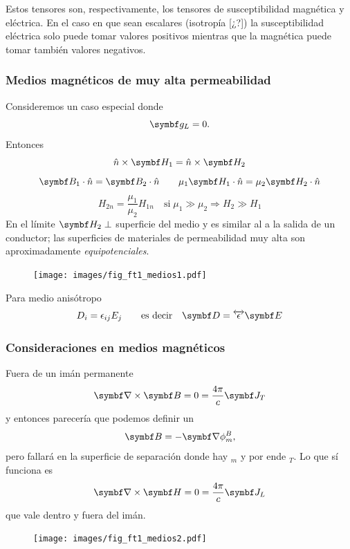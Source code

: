 \documentclass[10pt,oneside]{CBFT_book}
\begin{document}
Estos tensores son, respectivamente, los tensores de susceptibilidad magnética y
eléctrica. En el caso en que sean escalares (isotropía [¿?]) la susceptibilidad
eléctrica solo puede tomar valores positivos mientras que la magnética puede
tomar también valores negativos.

\subsubsection{Medios magnéticos de muy alta permeabilidad}

Consideremos un caso especial donde
\[
	\vb{g}_L = 0.
\]
Entonces
\[
	\hat{n}\times\vb{H}_1 = \hat{n}\times\vb{H}_2
\]
\[
	\vb{B}_1\cdot\hat{n} = \vb{B}_2\cdot\hat{n} \qquad
		\mu_1\vb{H}_1\cdot\hat{n} = \mu_2\vb{H}_2\cdot\hat{n}
\]
\[
	H_{2n} = \frac{\mu_1}{\mu_2} H_{1n} \quad \text{si} \; \mu_1 \gg \mu_2 \Rightarrow H_2 \gg H_1
\]
En el límite $\vb{H}_2 \perp$ superficie del medio y es similar al  a la salida de un
conductor; las superficies de materiales de permeabilidad muy alta son aproximadamente {\it equipotenciales}.

\begin{figure}[htb]
	\begin{center}
	\texttt{[image: images/fig\_ft1\_medios1.pdf]}	 
	\end{center}
	\caption{}
\end{figure}

Para medio anisótropo
\[
	D_i = \epsilon_{ij} E_j \qquad \text{es decir} \quad \vb{D} = \overleftrightarrow{\epsilon} \vb{E}
\]

\subsubsection{Consideraciones en medios magnéticos}

Fuera de un imán permanente 
\[
	\rotorm{B} = 0 = \frac{4\pi}{c}\vb{J}_T
\]
y entonces parecería que podemos definir un
\[
	\vb{B} = -\Nabla \phi_m^B,
\]
pero fallará en la superficie de separación donde hay $_m$ y por ende $_T$. Lo que sí funciona
es
\[
	\rotorm{H} = 0 = \frac{4\pi}{c}\vb{J}_L
\]
que vale dentro y fuera del imán.
\begin{figure}[htb]
	\begin{center}
	\texttt{[image: images/fig\_ft1\_medios2.pdf]}	 
	\end{center}
	\caption{}
\end{figure}
\end{document}
